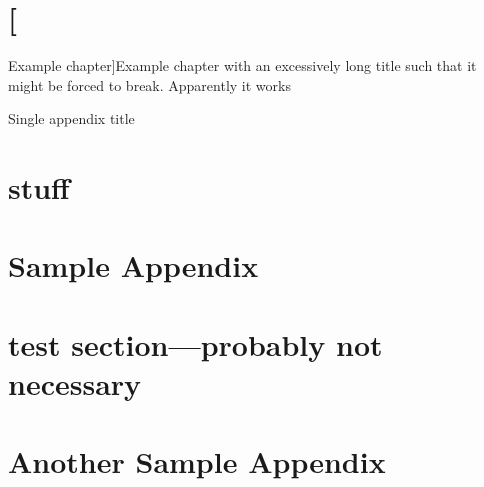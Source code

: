 \documentclass[microe]{ritthesis}
\providecommand{\chapter}[1]{\section{#1}}
\begin{document}
\chapter[Example chapter]{Example chapter with an excessively long title such that it might be forced to break. Apparently it works}
\lipsum[8-12]

\nocite{cheung,zhao,cao,zhang}

\nocite{*}


\begin{theappendix}{Single appendix title}
	\section{stuff}
	\lipsum[15-21]
\end{theappendix}

\appendix

\chapter{Sample Appendix}

\section{test section---probably not necessary}
\lipsum[6-12]
\chapter{Another Sample Appendix}
\lipsum[10-11]

\end{document}
